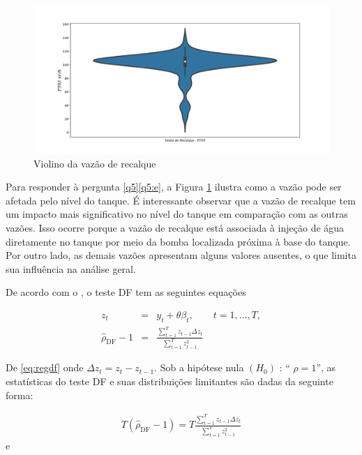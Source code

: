 	
	\begin{figure}[!htpb]
		\centering
		\caption{Violino da vazão de recalque}
		\label{fig:ft03}
		\includegraphics[width=0.9\linewidth]{Resultados/Figuras/ft03}
		
	\end{figure}
	
Para responder à pergunta \ref{q5}\ref{q5:e}, a Figura \ref{fig:ft03} ilustra como a vazão pode ser afetada pelo nível do tanque. É interessante observar que a vazão de recalque tem um impacto mais significativo no nível do tanque em comparação com as outras vazões. Isso ocorre porque a vazão de recalque está associada à injeção de água diretamente no tanque por meio da bomba localizada próxima à base do tanque. Por outro lado, as demais vazões apresentam alguns valores ausentes, o que limita sua influência na análise geral.	
	


De acordo com o , o teste DF tem as seguintes equações

\begin{eqnarray}
	z_t&=& y_t+\theta \beta_t, \qquad t=1,\ldots, T, \label{eq:df3}\\	
	\hat{\rho}_{\mathrm{DF}}-1&=&\frac{\sum_{t=1}^T z_{t-1} \Delta z_t}{\sum_{t=1}^T z_{t-1}^2} \label{eq:regdf}
\end{eqnarray}

De \eqref{eq:regdf} onde $\Delta z_t=z_t-z_{t-1}$. Sob a hipótese nula $\left(H_0\right)$ : `` $\rho=1$'', as estatísticas do teste DF e suas distribuições limitantes são dadas da seguinte forma:


\begin{eqnarray}
	T\left(\hat{\rho}_{\mathrm{DF}}-1\right)=T \frac{\sum_{t=1}^T z_{t-1} \Delta z_t}{\sum_{t=1}^T z_{t-1}^2}
\end{eqnarray}
e


